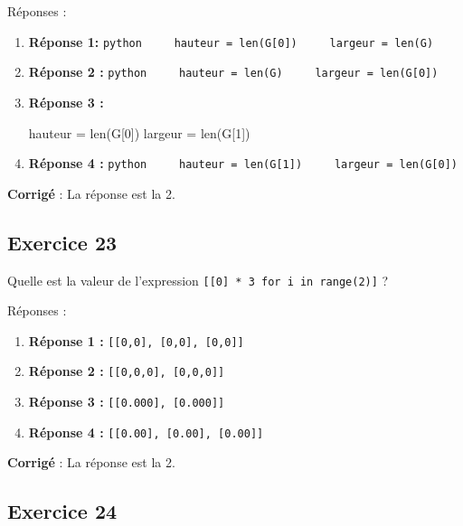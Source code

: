 \documentclass[11pt]{article}
\providecommand{\tightlist}{%
      \setlength{\itemsep}{0pt}\setlength{\parskip}{0pt}}
\newenvironment{Shaded}{}{}
\newcommand{\DecValTok}[1]{\textcolor[rgb]{0.25,0.63,0.44}{{#1}}}
\newcommand{\NormalTok}[1]{{#1}}
\newcommand{\OperatorTok}[1]{\textcolor[rgb]{0.40,0.40,0.40}{{#1}}}
\newcommand{\BuiltInTok}[1]{{#1}}
\begin{document}
Réponses :

\begin{enumerate}
\def\labelenumi{\arabic{enumi}.}
\item
  \textbf{Réponse 1:}
  \texttt{python\ \ \ \ \ hauteur\ =\ len(G{[}0{]})\ \ \ \ \ largeur\ =\ len(G)}
\item
  \textbf{Réponse 2 :}
  \texttt{python\ \ \ \ \ hauteur\ =\ len(G)\ \ \ \ \ largeur\ =\ len(G{[}0{]})}
\item
  \textbf{Réponse 3 :}

\begin{Shaded}
\begin{Highlighting}[]
\NormalTok{hauteur }\OperatorTok{=} \BuiltInTok{len}\NormalTok{(G[}\DecValTok{0}\NormalTok{])}
\NormalTok{largeur }\OperatorTok{=} \BuiltInTok{len}\NormalTok{(G[}\DecValTok{1}\NormalTok{])}
\end{Highlighting}
\end{Shaded}
\item
  \textbf{Réponse 4 :}
  \texttt{python\ \ \ \ \ hauteur\ =\ len(G{[}1{]})\ \ \ \ \ largeur\ =\ len(G{[}0{]})}
\end{enumerate}

    \textbf{Corrigé} : La réponse est la 2.

    \hypertarget{exercice-23}{%
\subsection{Exercice 23}\label{exercice-23}}

Quelle est la valeur de l'expression
\texttt{{[}{[}0{]}\ *\ 3\ for\ i\ in\ range(2){]}} ?

Réponses :

\begin{enumerate}
\def\labelenumi{\arabic{enumi}.}
\tightlist
\item
  \textbf{Réponse 1 :} \texttt{{[}{[}0,0{]},\ {[}0,0{]},\ {[}0,0{]}{]}}
\item
  \textbf{Réponse 2 :} \texttt{{[}{[}0,0,0{]},\ {[}0,0,0{]}{]}}
\item
  \textbf{Réponse 3 :} \texttt{{[}{[}0.000{]},\ {[}0.000{]}{]}}
\item
  \textbf{Réponse 4 :}
  \texttt{{[}{[}0.00{]},\ {[}0.00{]},\ {[}0.00{]}{]}}
\end{enumerate}

    \textbf{Corrigé} : La réponse est la 2.

    \hypertarget{exercice-24}{%
\subsection{Exercice 24}\label{exercice-24}}
\end{document}
